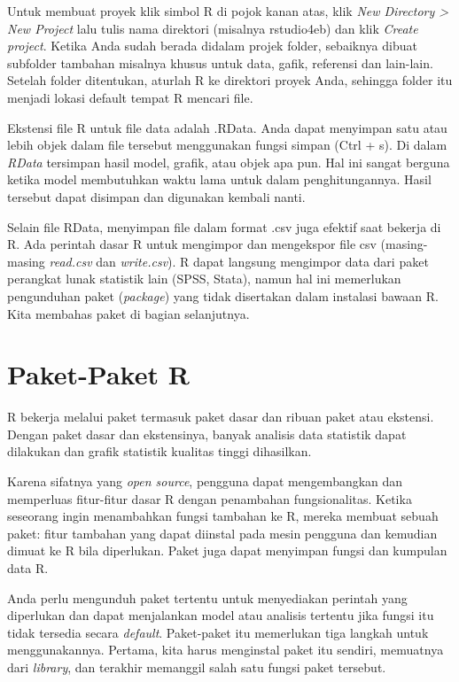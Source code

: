 \documentclass[a4paper, nobind]{templates/ociamthesis}
\begin{document}
Untuk membuat proyek klik simbol R di pojok kanan atas, klik \emph{New Directory \textgreater{} New Project} lalu tulis nama direktori (misalnya rstudio4eb) dan klik \emph{Create project}. Ketika Anda sudah berada didalam projek folder, sebaiknya dibuat subfolder tambahan misalnya khusus untuk data, gafik, referensi dan lain-lain. Setelah folder ditentukan, aturlah R ke direktori proyek Anda, sehingga folder itu menjadi lokasi default tempat R mencari file.

Ekstensi file R untuk file data adalah .RData. Anda dapat menyimpan satu atau lebih objek dalam file tersebut menggunakan fungsi simpan (Ctrl + s). Di dalam \emph{RData} tersimpan hasil model, grafik, atau objek apa pun. Hal ini sangat berguna ketika model membutuhkan waktu lama untuk dalam penghitungannya. Hasil tersebut dapat disimpan dan digunakan kembali nanti.

Selain file RData, menyimpan file dalam format .csv juga efektif saat bekerja di R. Ada perintah dasar R untuk mengimpor dan mengekspor file csv (masing-masing \emph{read.csv} dan \emph{write.csv}). R dapat langsung mengimpor data dari paket perangkat lunak statistik lain (SPSS, Stata), namun hal ini memerlukan pengunduhan paket (\emph{package}) yang tidak disertakan dalam instalasi bawaan R. Kita membahas paket di bagian selanjutnya.

\hypertarget{paket-paket-r}{%
\section{Paket-Paket R}\label{paket-paket-r}}

R bekerja melalui paket termasuk paket dasar dan ribuan paket atau ekstensi. Dengan paket dasar dan ekstensinya, banyak analisis data statistik dapat dilakukan dan grafik statistik kualitas tinggi dihasilkan.

Karena sifatnya yang \emph{open source}, pengguna dapat mengembangkan dan memperluas fitur-fitur dasar R dengan penambahan fungsionalitas. Ketika seseorang ingin menambahkan fungsi tambahan ke R, mereka membuat sebuah paket: fitur tambahan yang dapat diinstal pada mesin pengguna dan kemudian dimuat ke R bila diperlukan. Paket juga dapat menyimpan fungsi dan kumpulan data R.

Anda perlu mengunduh paket tertentu untuk menyediakan perintah yang diperlukan dan dapat menjalankan model atau analisis tertentu jika fungsi itu tidak tersedia secara \emph{default}. Paket-paket itu memerlukan tiga langkah untuk menggunakannya. Pertama, kita harus menginstal paket itu sendiri, memuatnya dari \emph{library}, dan terakhir memanggil salah satu fungsi paket tersebut.
\end{document}
